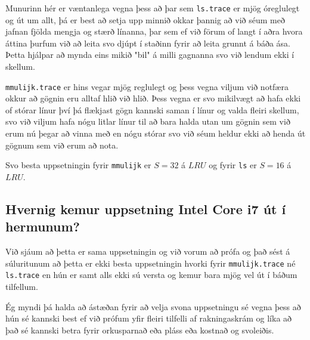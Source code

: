 \documentclass{article}
\begin{document}
	Munurinn hér er væntanlega vegna þess að þar sem \texttt{ls.trace} 
	er mjög óreglulegt og út um allt, þá er best að setja upp minnið okkar 
	þannig að við séum með jafnan fjölda mengja og stærð línanna, þar sem 
	ef við förum of langt í aðra hvora áttina þurfum við að leita svo djúpt
	í staðinn fyrir að leita grunnt á báða ása. Þetta hjálpar að mynda eins 
	mikið "bil" á milli gagnanna svo við lendum ekki í skellum.

	\texttt{mmulijk.trace} er hins vegar mjög reglulegt og þess vegna 
	viljum við notfæra okkur að gögnin eru alltaf hlið við hlið. Þess vegna 
	er svo mikilvægt að hafa ekki of stórar línur því þá flækjast gögn 
	kannski saman í línur og valda fleiri skellum, svo við viljum 
	hafa nógu litlar línur til að bara halda utan um gögnin sem við erum 
	nú þegar að vinna með en nógu stórar svo við séum heldur ekki að 
	henda út gögnum sem við erum að nota. 

	Svo besta uppsetningin fyrir \texttt{mmulijk} er $S=32$ á $LRU$ og 
	fyrir \texttt{ls} er $S=16$ á $LRU$.

	\subsection{Hvernig kemur uppsetning Intel Core i7 út í hermunum?}
	Við sjáum að þetta er sama uppsetningin og við vorum að prófa og það 
	sést á súluritunum að þetta er ekki besta uppsetningin hvorki fyrir 
	\texttt{mmulijk.trace} né \texttt{ls.trace} en hún er samt alls ekki 
	sú versta og kemur bara mjög vel út í báðum tilfellum. 

	Ég myndi þá halda að ástæðan fyrir að velja svona uppsetningu sé 
	vegna þess að hún sé kannski best ef við prófum yfir fleiri tilfelli 
	af rakningaskrám og líka að það sé kannski betra fyrir orkusparnað 
	eða pláss eða kostnað og svoleiðis. 
	
\end{document}
